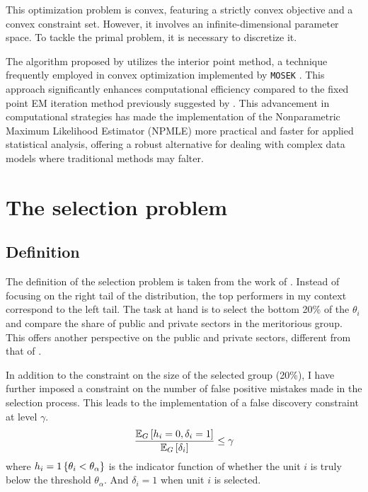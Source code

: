 \documentclass[12pt]{article}
\begin{document}
This optimization problem is convex, featuring a strictly convex objective and
a convex constraint set. However, it involves an infinite-dimensional parameter
space. To tackle the primal problem, it is necessary to discretize it.

The algorithm proposed by \citet{koenker2014convex} utilizes the interior point
method, a technique frequently employed in convex optimization implemented by
\verb+MOSEK+ \citep{andersen2010mosek}. This approach significantly enhances
computational efficiency compared to the fixed point EM iteration method
previously suggested by \citet{jiang2009general}. This advancement in
computational strategies has made the implementation of the Nonparametric
Maximum Likelihood Estimator (NPMLE) more practical and faster for applied
statistical analysis, offering a robust alternative for dealing with complex
data models where traditional methods may falter.


\section{The selection problem}
\subsection{Definition}
The definition of the selection problem is taken from the work of
\citet{gu2023invidious}. Instead of focusing on the right tail of the
distribution, the top performers in my context correspond to the left tail. The
task at hand is to select the bottom 20\% of the \( \theta_i \) and compare the
share of public and private sectors in the meritorious group. This offers
another perspective on the public and private sectors, different from that of
\citet{croiset2024hospitals}.

In addition to the constraint on the size of the selected group (20\%), I have
further imposed a constraint on the number of false positive mistakes made in
the selection process. This leads to the implementation of a false discovery
constraint at level \( \gamma \).
\begin{equation*}
    \frac{\mathbb{E}_G\left[h_i=0,\delta_i=1\right]}{\mathbb{E}_G\left[\delta_i\right]} \le \gamma
\end{equation*} where $h_i=1\left\{\theta_i<\theta_\alpha\right\}$ is the indicator function of whether the unit $i$ is truly below the threshold $\theta_\alpha$. And $\delta_i=1$ when unit $i$ is selected.
\end{document}
